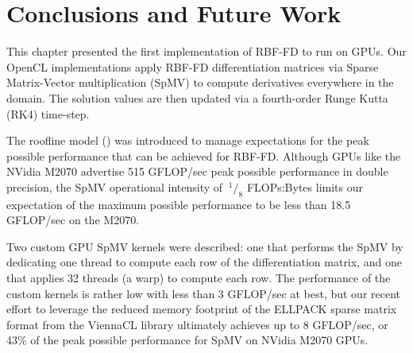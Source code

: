 \documentclass{report}
\begin{document}
\section{Conclusions and Future Work}

This chapter presented the first implementation of RBF-FD to run on GPUs. Our OpenCL implementations apply RBF-FD differentiation matrices via Sparse Matrix-Vector multiplication (SpMV) to compute derivatives everywhere in the domain. The solution values are then updated via a fourth-order Runge Kutta (RK4) time-step. 


The roofline model (\cite{Williams2009}) was introduced to manage expectations for the peak possible performance that can be achieved for RBF-FD. Although GPUs like the NVidia M2070 advertise 515 GFLOP/sec peak possible performance in double precision, the SpMV operational intensity of $\ ^{1}/_{8}$ FLOPs:Bytes limits our expectation of the maximum possible performance to be less than 18.5 GFLOP/sec on the M2070.   

Two custom GPU SpMV kernels were described: one that performs the SpMV by dedicating one thread to compute each row of the differentiation matrix, and one that applies 32 threads (a warp) to compute each row. The performance of the custom kernels is rather low with less than 3 GFLOP/sec at best, but our recent effort to leverage the reduced memory footprint of the ELLPACK sparse matrix format from the ViennaCL library ultimately achieves up to 8 GFLOP/sec, or 43\% of the peak possible performance for SpMV on NVidia M2070 GPUs. 
\end{document}

